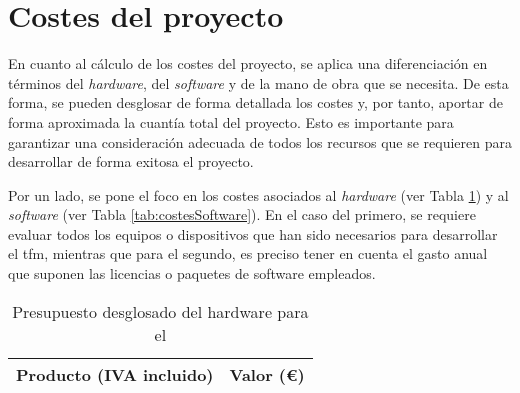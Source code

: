 \section{Costes del proyecto}

En cuanto al cálculo de los costes del proyecto, se aplica una diferenciación en términos del \textit{hardware}, del \textit{software} y de la mano de obra que se necesita. De esta forma, se pueden desglosar de forma detallada los costes y, por tanto, aportar de forma aproximada la cuantía total del proyecto. Esto es importante para garantizar una consideración adecuada de todos los recursos que se requieren para desarrollar de forma exitosa el proyecto.

\vspace{3mm}

Por un lado, se pone el foco en los costes asociados al \textit{hardware} (ver Tabla \ref{tab:costesHardware}) y al \textit{software} (ver Tabla \ref{tab:costesSoftware}). En el caso del primero, se requiere evaluar todos los equipos o dispositivos que han sido necesarios para desarrollar el \gls{tfm}, mientras que para el segundo, es preciso tener en cuenta el gasto anual que suponen las licencias o paquetes de software empleados. 

\vspace{3mm}

\begin{table}[ht]
	\centering
	\begin{tabular}{|c|r|}
		\hline
		\rowcolor[HTML]{EFEFEF}
		\textbf{Producto (IVA incluido)}           & \multicolumn{1}{c|}{\cellcolor[HTML]{EFEFEF}\textbf{Valor (€)}} \\ \hline
	\end{tabular}
	\caption{Presupuesto desglosado del hardware para el }
	\label{tab:costesHardware}
\end{table}


